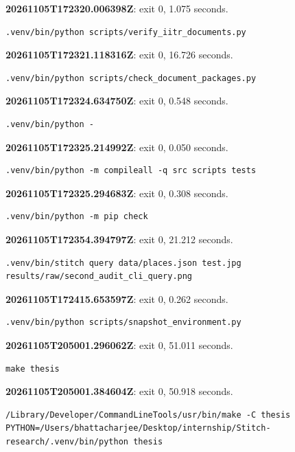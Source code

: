 \noindent\textbf{20261105T172320.006398Z}: exit 0, 1.075 seconds.
\begin{lstlisting}[numbers=none]
.venv/bin/python scripts/verify_iitr_documents.py
\end{lstlisting}

\noindent\textbf{20261105T172321.118316Z}: exit 0, 16.726 seconds.
\begin{lstlisting}[numbers=none]
.venv/bin/python scripts/check_document_packages.py
\end{lstlisting}

\noindent\textbf{20261105T172324.634750Z}: exit 0, 0.548 seconds.
\begin{lstlisting}[numbers=none]
.venv/bin/python -
\end{lstlisting}

\noindent\textbf{20261105T172325.214992Z}: exit 0, 0.050 seconds.
\begin{lstlisting}[numbers=none]
.venv/bin/python -m compileall -q src scripts tests
\end{lstlisting}

\noindent\textbf{20261105T172325.294683Z}: exit 0, 0.308 seconds.
\begin{lstlisting}[numbers=none]
.venv/bin/python -m pip check
\end{lstlisting}

\noindent\textbf{20261105T172354.394797Z}: exit 0, 21.212 seconds.
\begin{lstlisting}[numbers=none]
.venv/bin/stitch query data/places.json test.jpg results/raw/second_audit_cli_query.png
\end{lstlisting}

\noindent\textbf{20261105T172415.653597Z}: exit 0, 0.262 seconds.
\begin{lstlisting}[numbers=none]
.venv/bin/python scripts/snapshot_environment.py
\end{lstlisting}

\noindent\textbf{20261105T205001.296062Z}: exit 0, 51.011 seconds.
\begin{lstlisting}[numbers=none]
make thesis
\end{lstlisting}

\noindent\textbf{20261105T205001.384604Z}: exit 0, 50.918 seconds.
\begin{lstlisting}[numbers=none]
/Library/Developer/CommandLineTools/usr/bin/make -C thesis PYTHON=/Users/bhattacharjee/Desktop/internship/Stitch-research/.venv/bin/python thesis
\end{lstlisting}

